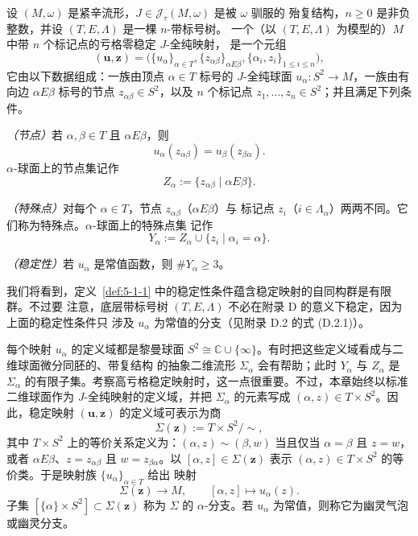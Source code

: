 \begin{definition}\label{def:5-1-1}
设 $(M,\omega)$ 是紧辛流形，$J\in\mathcal J_\tau(M,\omega)$ 是被 $\omega$ 驯服的
殆复结构，$n\ge0$ 是非负整数，并设 $(T,E,\Lambda)$ 是一棵 $n$-带标号树。
一个（以 $(T,E,\Lambda)$ 为模型的）$M$ 中带 $n$ 个标记点的亏格零稳定 $J$-全纯映射，
是一个元组
\[
  (\mathbf u,\mathbf z)
  =\bigl(\{u_\alpha\}_{\alpha\in T},
    \{z_{\alpha\beta}\}_{\alpha E\beta},
    \{\alpha_i,z_i\}_{1\le i\le n}\bigr),
\]
它由以下数据组成：一族由顶点 $\alpha\in T$ 标号的 $J$-全纯球面
$u_\alpha:S^2\to M$，一族由有向边 $\alpha E\beta$ 标号的节点
$z_{\alpha\beta}\in S^2$，以及 $n$ 个标记点 $z_1,\ldots,z_n\in S^2$；并且满足下列条件。

\emph{（节点）}若 $\alpha,\beta\in T$ 且 $\alpha E\beta$，则
\[
  u_\alpha(z_{\alpha\beta})=u_\beta(z_{\beta\alpha}).
\]
$\alpha$-球面上的节点集记作
\[
  Z_\alpha:=\{z_{\alpha\beta}\mid\alpha E\beta\}.
\]

\emph{（特殊点）}对每个 $\alpha\in T$，节点 $z_{\alpha\beta}$（$\alpha E\beta$）与
标记点 $z_i$（$i\in\Lambda_\alpha$）两两不同。它们称为特殊点。$\alpha$-球面上的特殊点集
记作
\[
  Y_\alpha:=Z_\alpha\cup\{z_i\mid\alpha_i=\alpha\}.
\]

\emph{（稳定性）}若 $u_\alpha$ 是常值函数，则 $\#Y_\alpha\ge3$。
\end{definition}

我们将看到，定义~\ref{def:5-1-1} 中的稳定性条件蕴含稳定映射的自同构群是有限群。不过要
注意，底层带标号树 $(T,E,\Lambda)$ 不必在附录 D 的意义下稳定，因为上面的稳定性条件只
涉及 $u_\alpha$ 为常值的分支（见附录 D.2 的式 (D.2.1)）。

每个映射 $u_\alpha$ 的定义域都是黎曼球面
$S^2\cong\mathbb C\cup\{\infty\}$。有时把这些定义域看成与二维球面微分同胚的、带复结构
的抽象二维流形 $\Sigma_\alpha$ 会有帮助；此时 $Y_\alpha$ 与 $Z_\alpha$ 是
$\Sigma_\alpha$ 的有限子集。考察高亏格稳定映射时，这一点很重要。不过，本章始终以标准
二维球面作为 $J$-全纯映射的定义域，并把 $\Sigma_\alpha$ 的元素写成
$(\alpha,z)\in T\times S^2$。因此，稳定映射 $(\mathbf u,\mathbf z)$ 的定义域可表示为商
\[
  \Sigma(\mathbf z):=T\times S^2/{\sim},
\]
其中 $T\times S^2$ 上的等价关系定义为：$(\alpha,z)\sim(\beta,w)$ 当且仅当
$\alpha=\beta$ 且 $z=w$，或者 $\alpha E\beta$、$z=z_{\alpha\beta}$ 且
$w=z_{\beta\alpha}$。以 $[\alpha,z]\in\Sigma(\mathbf z)$ 表示
$(\alpha,z)\in T\times S^2$ 的等价类。于是映射族 $\{u_\alpha\}_{\alpha\in T}$ 给出
映射
\[
  \Sigma(\mathbf z)\longrightarrow M,
  \qquad [\alpha,z]\longmapsto u_\alpha(z).
\]
子集 $[\{\alpha\}\times S^2]\subset\Sigma(\mathbf z)$ 称为 $\Sigma$ 的
$\alpha$-分支。若 $u_\alpha$ 为常值，则称它为幽灵气泡或幽灵分支。

